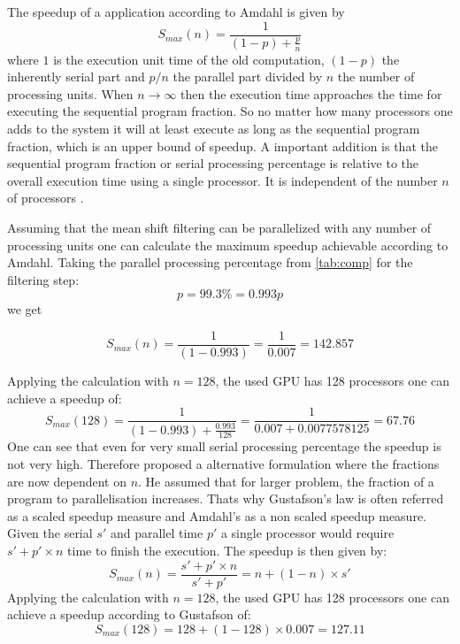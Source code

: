 The speedup of a application according to Amdahl is given by
\begin{equation}\label{eq:amdahl}
  S_{max}(n) = \frac{1}{(1-p) + \frac{p}{n}}
\end{equation} 
where $1$ is the execution unit time of the old computation, $(1-p)$
the inherently serial part and $p/n$ the parallel part divided by $n$
the number of processing units. When $n \rightarrow \infty$ then the
execution time approaches the time for executing the sequential
program fraction. So no matter how many processors one adds to the
system it will at least execute as long as the sequential program
fraction, which is an upper bound of speedup. A important addition is
that the sequential program fraction or serial processing percentage
is relative to the overall execution time using a single processor. It
is independent of the number $n$ of processors
\citeauthor{citeulike:3838998} \citep{citeulike:3838998}.

Assuming that the mean shift filtering can be parallelized with any number of
processing units one can calculate the maximum speedup achievable according to
Amdahl. Taking the parallel processing percentage from \autoref{tab:comp} for
the filtering step:
\begin{equation*}\label{eq:parallel}
  p = 99.3\% = 0.993 
  p\end{equation*}
we get

\begin{equation*}\label{eq:am0}
  S_{max}(n) = \frac{1}{(1-0.993)} = \frac{1}{0.007} = 142.857	
\end{equation*}

Applying the calculation with $n = 128$, the used \gls{GPU} has 128
processors one can achieve a speedup of:
\begin{equation*}\label{eq:g92sp}
  S_{max}(128) = \frac{1}{(1-0.993) + \frac{0.993}{128}} = \frac{1}{0.007 + 0.0077578125} = 67.76
\end{equation*}
One can see that even for very small serial processing percentage the speedup is
not very high. Therefore \citeauthor{citeulike:3732921} proposed a alternative
formulation where the fractions are now dependent on $n$. He assumed that for
larger problem, the fraction of a program to parallelisation increases. Thats
why Gustafson's law is often referred as a scaled speedup measure and Amdahl's
as a non scaled speedup measure. Given the serial $s'$ and parallel time $p'$ a
single processor would require $s' + p' \times n$ time to finish the execution.
The speedup is then given by:
\begin{equation}\label{eq:gus}
  S_{max}(n) = \frac{s' + p' \times n}{s' + p'} = n + ( 1 - n ) \times s'
\end{equation}
Applying the calculation with $n = 128$, the used \gls{GPU} has 128 processors
one can achieve a speedup according to Gustafson of:
\begin{equation*}\label{eq:g92sp}
  S_{max}(128) = 128 + (1 - 128) \times 0.007 = 127.11
\end{equation*}

